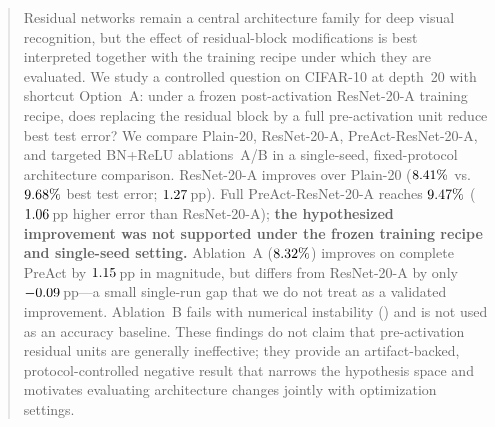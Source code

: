 \begin{abstract}
Residual networks remain a central architecture family for deep visual recognition, but the
effect of residual-block modifications is best interpreted together with the training recipe
under which they are evaluated.
We study a controlled question on CIFAR-10 at depth~20 with shortcut Option~A: under a frozen
post-activation ResNet-20-A training recipe, does replacing the residual block by a full
pre-activation unit reduce best test error?
We compare Plain-20, ResNet-20-A, PreAct-ResNet-20-A, and targeted BN+ReLU ablations~A/B in a
single-seed, fixed-protocol architecture comparison.
ResNet-20-A improves over Plain-20 ($\ErrResNet\%$ vs.\ $\ErrPlain\%$ best test error;
$\ResidualAdvantagePP$\,pp).
Full PreAct-ResNet-20-A reaches $\ErrPreAct\%$
($\DeltaPreActMinusResNet$\,pp higher error than ResNet-20-A);
\textbf{the hypothesized improvement was not supported under the frozen training recipe and
single-seed setting.}
Ablation~A ($\ErrAblationA\%$) improves on complete PreAct by $\DeltaAblationAVsPreAct$\,pp in
magnitude, but differs from ResNet-20-A by only $\DeltaAblationAMinusResNet$\,pp---a small
single-run gap that we do not treat as a validated improvement.
Ablation~B fails with numerical instability (\AblationBStatus) and is not used as an accuracy
baseline.
These findings do not claim that pre-activation residual units are generally ineffective; they
provide an artifact-backed, protocol-controlled negative result that narrows the hypothesis space
and motivates evaluating architecture changes jointly with optimization settings.
\end{abstract}
